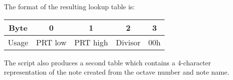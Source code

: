 The format of the resulting lookup table is:
\begin{nowordcount}
\begin{center}
\begin{tabular}{c || c | c | c | c}
Byte & 0 & 1 & 2 & 3 \\
\hline
Usage & PRT low & PRT high & Divisor & 00h \\
\end{tabular}
\end{center}
\end{nowordcount}

The script also produces a second table which contains a 4-character representation of the note 
created from the octave number and note name.
